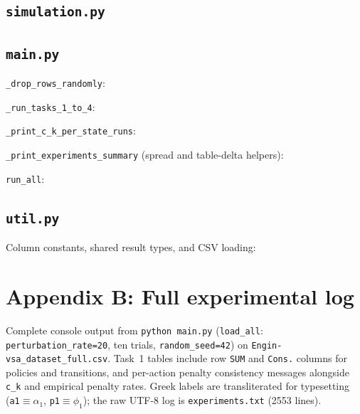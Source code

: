 \documentclass[11pt,a4paper]{article}
\begin{document}


\subsection{\texttt{simulation.py}}\label{app:simulation}



\subsection{\texttt{main.py}}\label{app:main}

\texttt{\_drop\_rows\_randomly}:


\texttt{\_run\_tasks\_1\_to\_4}:


\texttt{\_print\_c\_k\_per\_state\_runs}:


\texttt{\_print\_experiments\_summary} (spread and table-delta helpers):



\texttt{run\_all}:


\subsection{\texttt{util.py}}\label{app:util}

Column constants, shared result types, and CSV loading:





%
\section*{Appendix B: Full experimental log}%
\label{app:experiments}%
%

Complete console output from \texttt{python main.py} (\texttt{load\_all}:
\texttt{perturbation\_rate=20}, ten trials, \texttt{random\_seed=42}) on
\texttt{Engin-vsa\_dataset\_full.csv}.
Task~1 tables include row \texttt{SUM} and \texttt{Cons.} columns for policies and
transitions, and per-action penalty consistency messages alongside \texttt{c\_k} and
empirical penalty rates.
Greek labels are transliterated for typesetting
(\texttt{a1}$\equiv\alpha_1$, \texttt{p1}$\equiv\phi_1$); the raw UTF-8 log is
\texttt{experiments.txt} (2553 lines).


\end{document}
